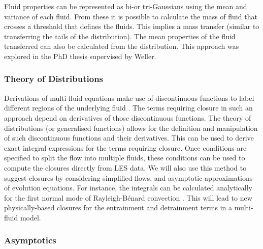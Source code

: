 \documentclass[11pt,a4paper]{article}
\begin{document}
Fluid properties can be represented as bi-or tri-Gaussians using the mean and variance of each fluid. From these it is possible to calculate the mass of fluid that crosses a threshold that defines the fluids. This implies a mass transfer (similar to transferring the tails of the distribution). The mean properties of the fluid transferred can also be calculated from the distribution. This approach was explored in the PhD thesis \cite{McIn20} supervised by Weller.

\subsubsection*{Theory of Distributions}

Derivations of multi-fluid equations make use of discontinuous functions to label different regions of the underlying fluid \cite[]{Dopa77,TWV+18}. The terms requiring closure in such an approach depend on derivatives of those discontinuous functions. The theory of distributions (or generalised functions) \cite[]{Schw08} allows for the definition and manipulation of such discontinuous functions and their derivatives. This can be used to derive exact integral expressions for the terms requiring closure. Once conditions are specified to split the flow into multiple fluids, these conditions can be used to compute the closures directly from LES data. We will also use this method to suggest closures by considering simplified flows, and asymptotic approximations of evolution equations. For instance, the integrals can be calculated analytically for the first normal mode of Rayleigh-B\'{e}nard convection  \cite[]{SWCM2x}. This will lead to new physically-based closures for the entrainment and detrainment terms in a multi-fluid model. 

\subsubsection*{Asymptotics}
\end{document}
